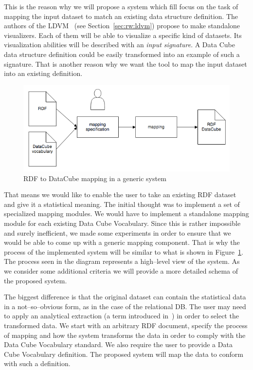 This is the reason why we will propose a system which fill focus on the task of 
mapping the input dataset to match an existing data structure definition. 
The authors of the LDVM~\cite{ldvm} (see Section~\ref{sec:rw:ldvm}) propose to make standalone
visualizers. Each of them will 
be able to visualize a specific kind of datasets. Its visualization abilities will be described with
an \emph{input signature}. A Data Cube data structure definition could be easily transformed into
an example of such a signature. That is another reason why we want the tool to 
map the input dataset into an existing definition.

\begin{figure}
	\centering
	\includegraphics[width=140mm]{img/generic-mapping.png}
	\caption{RDF to DataCube mapping in a generic system}
	\label{fig:generic-mapping}
\end{figure}

That means we would like to enable the user to take an existing RDF
dataset and give it a statistical meaning. The initial thought was to
implement a set of specialized 
mapping modules. We would have to implement a standalone mapping module for
each existing Data Cube Vocabulary. Since this is rather impossible and 
surely inefficient, we made some experiments in order to ensure that we would be able to come 
up with a generic mapping component. That is why the process of the implemented
system will be similar to what is shown in Figure~\ref{fig:generic-mapping}. The 
process seen in the diagram represents a high--level view of the system. As we 
consider some additional criteria we will provide a more detailed schema of the 
proposed system. 

The biggest difference is that the original dataset can contain the statistical 
data in a not--so--obvious form, as in the case of the relational DB.
The user may need to apply an analytical 
extraction (a term introduced in~\cite{ldvm}) in order to select the transformed data.
We start with an arbitrary RDF document, 
specify the process of mapping and how the system transforms the data in order
to comply with the Data Cube Vocabulary standard. We also require the user to 
provide a Data Cube Vocabulary definition. The proposed system will map the data
to conform with such a definition.

